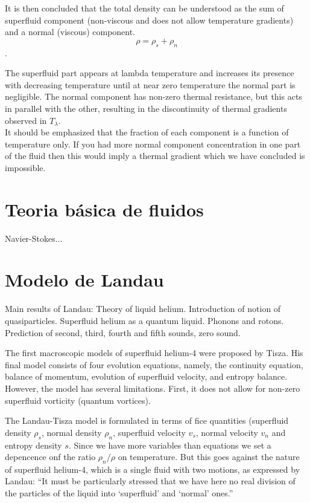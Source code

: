 \documentclass{article}
\begin{document}
It is then concluded that the total density can be understood as the sum of superfluid component (non-viscous and does not allow temperature gradients) and a normal (viscous) component.
\\

\[\rho = \rho_s + \rho_n\].

The superfluid part appears at lambda temperature and increases its presence with decreasing temperature until at near zero temperature the normal part is negligible. The normal component has non-zero thermal resistance, but this acts in parallel with the other, resulting in the discontinuity of thermal gradients observed in $T_\lambda$.
\\

It should be emphasized that the fraction of each component is a function of temperature only. If you had more normal component concentration in one part of the fluid then this would imply a thermal gradient which we have concluded is impossible.
\\

\section{Teoria básica de fluidos}

Navier-Stokes...

\section{Modelo de Landau}
\cite{Kincl}
Main results of Landau:
Theory of liquid helium. Introduction of notion of quasiparticles. Superfluid
helium as a quantum liquid. Phonons and rotons. Prediction of second, third,
fourth and fifth sounds, zero sound.

\cite{PhysRev.60.356}

The first macroscopic models of superfluid helium-4 were
proposed by Tisza. His final model consists of four evolution equations, namely, the continuity equation, balance of momentum, evolution of superfluid velocity, and entropy balance. However, the model has several limitations. First, it does not allow for non-zero superfluid vorticity (quantum vortices). 

The Landau-Tisza model is formulated in terms of fice quantities (superfluid density $\rho_s$, normal density $\rho_n$, superfluid velocity $v_s$, normal velocity $v_n$ and entropy density $s$. Since we have more variables than equations we set a depencence onf the ratio $\rho_n/\rho$ on temperature. But this goes against the nature of superfluid helium-4, which is a single fluid with two motions, as expressed by Landau: “It must be particularly stressed that we
have here no real division of the particles of the liquid into ‘superfluid’
and ‘normal’ ones.”
\end{document}
